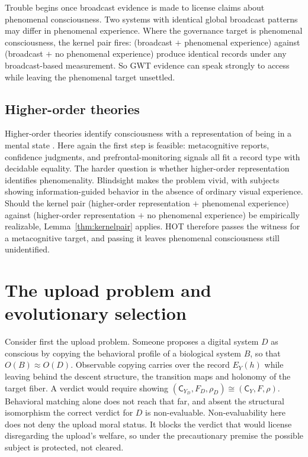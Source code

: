 \documentclass[11pt]{article}
\begin{document}
Trouble begins once broadcast evidence is made to license claims about
phenomenal consciousness. Two systems with identical global broadcast patterns
may differ in phenomenal experience. Where the governance target is phenomenal
consciousness, the kernel pair fires: (broadcast $+$ phenomenal experience)
against (broadcast $+$ no phenomenal experience) produce identical records under
any broadcast-based measurement. So GWT evidence can speak strongly to access
while leaving the phenomenal target unsettled.

\subsection{Higher-order theories}
\label{sec:hot}

Higher-order theories identify consciousness with a representation of being in a
mental state \citep{rosenthal2005,carruthers2000}. Here again the first step is
feasible: metacognitive reports, confidence judgments, and prefrontal-monitoring
signals all fit a record type with decidable equality. The harder
question is whether higher-order representation identifies phenomenality.
Blindsight makes the problem vivid, with subjects showing information-guided
behavior in the absence of ordinary visual experience. Should the kernel pair
(higher-order representation $+$ phenomenal experience) against (higher-order
representation $+$ no phenomenal experience) be empirically realizable,
Lemma~\ref{thm:kernelpair} applies. HOT therefore passes the witness for a
metacognitive target, and passing it leaves phenomenal consciousness still
unidentified.

\section{The upload problem and evolutionary selection}
\label{sec:applications}

Consider first the upload problem. Someone proposes a digital system $D$ as
conscious by copying the behavioral profile of a biological system $B$, so that
$O(B) \approx O(D)$. Observable copying carries over the record $E_Y(h)$ while
leaving behind the descent structure, the transition maps and holonomy of the
target fiber. A verdict would require showing
$(\mathsf{C}_{Y_D}, F_D, \rho_D) \cong (\mathsf{C}_Y, F, \rho)$. Behavioral
matching alone does not reach that far, and absent the structural isomorphism the
correct verdict for $D$ is non-evaluable.
Non-evaluability here does not deny the upload moral status. It blocks the
verdict that would license disregarding the upload's welfare, so under the
precautionary premise the possible subject is protected, not cleared.
\end{document}
